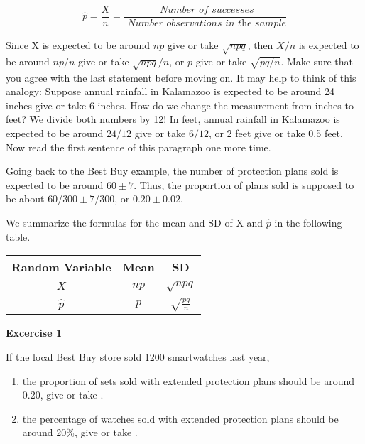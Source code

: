 \documentclass[11pt]{book}\usepackage[]{graphicx}\usepackage[]{color}
\begin{document}
\begin{equation*}
  \hat{p} = \frac{X}{n} = \frac{\textit{ Number of successes}}{\textit{ Number observations in the sample}}
\end{equation*}

Since X is expected to be around $np$ give or take $\sqrt{npq}$, then $X/n$ is expected to be around $np/n$ give or take $\sqrt{npq}/n$, or $p$ give or take $\sqrt{pq/n}$.  Make sure that you agree with the last statement before moving on.  It may help to think of this analogy: Suppose annual rainfall in Kalamazoo is expected to be around 24 inches give or take 6 inches.  How do we change the measurement from inches to feet?  We divide both numbers by 12! In feet, annual rainfall in Kalamazoo is expected to be around $24/12$ give or take $6/12$, or 2 feet give or take 0.5 feet.  Now read the first sentence of this paragraph one more time.

Going back to the Best Buy example, the number of protection plans sold is expected to be around $60 \pm 7$.   Thus, the proportion of plans sold is supposed to be about $60/300 \pm 7/300$, or $0.20 \pm 0.02$.

We summarize the formulas for the mean and SD of X and $\hat{p}$ in the following table.

\begin{table}[ht]
\centering
\begin{tabular}{@{} ccc @{}} \hline
Random Variable & Mean & SD \\ \hline
$X$ & $np$ & $\sqrt{npq}$ \\
$\hat{p}$ & $p$ & $\sqrt{\frac{pq}{n}}$  \\ \hline
\end{tabular}
\end{table}


\begin{minipage}[ht]{29mm}

\vspace{-21mm}

\textbf{Excercise 1}
\end{minipage}
\begin{minipage}[ht]{109mm}

{\parbox{108mm}{
If the local Best Buy store sold 1200 smartwatches last year,

\begin{enumerate}
\item the proportion of sets sold with extended protection plans should be around 0.20, give or take \underline{\phantom{xxxxxxxx}}.
\item the percentage of watches sold with extended protection plans should be around 20\%, give or take \underline{\phantom{xxxxxxxx}}.
\end{enumerate}
}}

\end{minipage}
\end{document}
